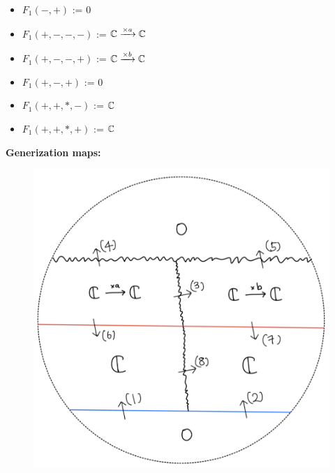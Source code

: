 \begin{itemize}
\item $F_1(-,+)$ := $0$
\item $F_1(+,-,-,-)$ := $\mathbb{C} \xrightarrow{\times a} \mathbb{C} $
\item $F_1(+,-,-,+)$ := $\mathbb{C} \xrightarrow{\times b} \mathbb{C} $
\item $F_1(+,-,+)$ := $0$
\item $F_1(+,+,*,-)$ := $\mathbb{C}$
\item $F_1(+,+,*,+)$ := $\mathbb{C}$
\end{itemize}
\textbf{Generization maps:}
\begin{figure}[H]
    \centering
    \includegraphics[scale = 0.45]{diagrams/lemma2/47.png} 
    \caption{}
    \label{fig:your-label}
\end{figure}
